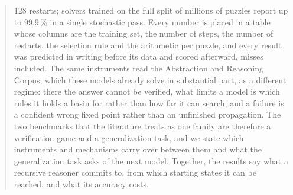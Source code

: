 \documentclass[11pt,letterpaper]{article}
\begin{document}
\begin{abstract}
128 restarts; solvers trained on the full split of millions of puzzles report up to 99.9\,\% in a single stochastic pass. Every number is placed in a table whose columns are the training set, the number of steps, the number of restarts, the selection rule and the arithmetic per puzzle, and every result was predicted in writing before its data and scored afterward, misses included. The same instruments read the Abstraction and Reasoning Corpus, which these models already solve in substantial part, as a different regime: there the answer cannot be verified, what limits a model is which rules it holds a basin for rather than how far it can search, and a failure is a confident wrong fixed point rather than an unfinished propagation. The two benchmarks that the literature treats as one family are therefore a verification game and a generalization task, and we state which instruments and mechanisms carry over between them and what the generalization task asks of the next model. Together, the results say what a recursive reasoner commits to, from which starting states it can be reached, and what its accuracy costs.
\end{abstract}














\appendix

\end{document}
